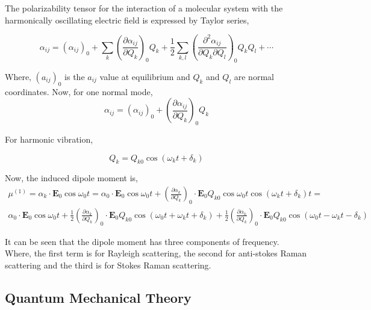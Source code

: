 \documentclass[openany,11pt,a4paper]{report}
\begin{document}
The polarizability tensor for the interaction of a molecular system with the harmonically oscillating electric field is expressed by Taylor series,

\begin{equation}
\alpha_{i j}=\left(\alpha_{i j}\right)_{0}+\sum_{k}\left(\frac{\partial \alpha_{i j}}{\partial Q_{k}}\right)_{0} Q_{k}+\frac{1}{2} \sum_{k, l}\left(\frac{\partial^{2} \alpha_{i j}}{\partial Q_{k} \partial Q_{l}}\right)_{0} Q_{k} Q_{l}+\cdots
\end{equation}

Where, $\left(a_{i j}\right)_{0}$ is the $a_{i j}$ value at equilibrium and $Q_{k}$ and  $Q_{l}$ are normal coordinates. Now, for one normal mode,
\begin{equation}
\alpha_{i j}=\left(\alpha_{i j}\right)_{0}+\left(\frac{\partial \alpha_{i j}}{\partial Q_{k}}\right)_{0} Q_{k}
\end{equation}

For harmonic vibration,

\begin{equation}
Q_{k}=Q_{k 0} \cos \left(\omega_{k} t+\delta_{k}\right)
\end{equation}

Now, the induced dipole moment is,
\begin{equation}
\begin{array}{c}{\mu^{(1)}=\alpha_{k} \cdot \mathbf{E}_{0} \cos \omega_{0} t=\alpha_{0} \cdot \mathbf{E}_{0} \cos \omega_{0} t+\left(\frac{\partial \alpha_{k}}{\partial Q_{k}}\right)_{0} \cdot \mathbf{E}_{0} Q_{k 0} \cos \omega_{0} t \cos \left(\omega_{k} t+\delta_{k}\right) t=} \\ {\alpha_{0} \cdot \mathbf{E}_{0} \cos \omega_{0} t+\frac{1}{2}\left(\frac{\partial \alpha_{k}}{\partial Q_{k}}\right)_{0} \cdot \mathbf{E}_{0} Q_{k 0} \cos \left(\omega_{0} t+\omega_{k} t+\delta_{k}\right)+\frac{1}{2}\left(\frac{\partial \alpha_{k}}{\partial Q_{k}}\right)_{0} \cdot \mathbf{E}_{0} Q_{k 0} \cos \left(\omega_{0} t-\omega_{k} t-\delta_{k}\right)}\end{array}
\end{equation}

It can be seen that the dipole moment has three components of frequency.  Where, the first term is for Rayleigh scattering, the second for anti-stokes Raman scattering and the third is for Stokes Raman scattering. \cite{bib2}  


\subsection*{Quantum Mechanical Theory}
\end{document}
